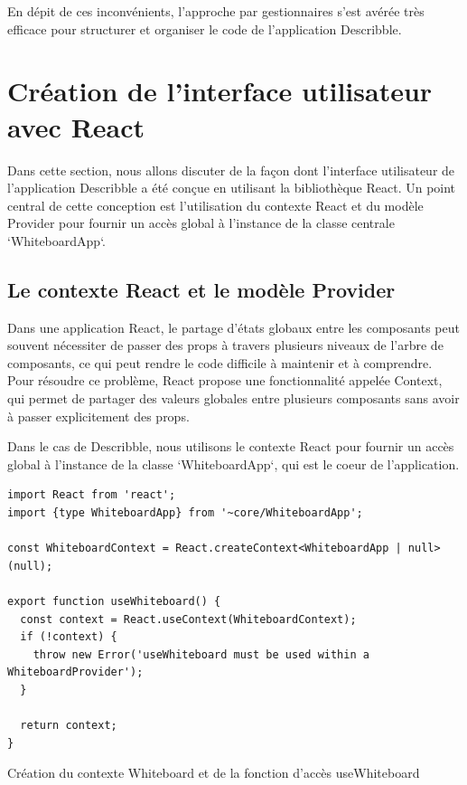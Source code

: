 En dépit de ces inconvénients, l'approche par gestionnaires s'est avérée très efficace pour structurer et organiser le code de l'application \Gls{Describble}.

\section{Création de l'interface utilisateur avec React}

Dans cette section, nous allons discuter de la façon dont l'interface utilisateur de l'application \Gls{Describble} a été conçue en utilisant la bibliothèque React. Un point central de cette conception est l'utilisation du contexte React et du modèle Provider pour fournir un accès global à l'instance de la classe centrale `WhiteboardApp`.

\subsection{Le contexte React et le modèle Provider}

Dans une application React, le partage d'états globaux entre les composants peut souvent nécessiter de passer des props à travers plusieurs niveaux de l'arbre de composants, ce qui peut rendre le code difficile à maintenir et à comprendre. Pour résoudre ce problème, React propose une fonctionnalité appelée Context, qui permet de partager des valeurs globales entre plusieurs composants sans avoir à passer explicitement des props.

Dans le cas de \Gls{Describble}, nous utilisons le contexte React pour fournir un accès global à l'instance de la classe `WhiteboardApp`, qui est le coeur de l'application.

\begin{listing}[H]
    \begin{verbatim}
import React from 'react';
import {type WhiteboardApp} from '~core/WhiteboardApp';

const WhiteboardContext = React.createContext<WhiteboardApp | null>(null);

export function useWhiteboard() {
  const context = React.useContext(WhiteboardContext);
  if (!context) {
    throw new Error('useWhiteboard must be used within a WhiteboardProvider');
  }

  return context;
}
  \end{verbatim}
    \caption{Création du contexte Whiteboard et de la fonction d'accès useWhiteboard}
\end{listing}

